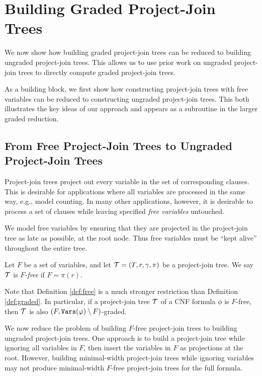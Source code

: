 








\section{Building Graded Project-Join Trees}

We now show how building graded project-join trees can be reduced to building ungraded project-join trees. 
This allows us to use prior work on ungraded project-join trees \cite{dudek2020dpmc} to directly compute graded project-join trees.

As a building block, we first show how constructing project-join trees with free variables can be reduced to constructing ungraded project-join trees. This both illustrates the key ideas of our approach and appears as a subroutine in the larger graded reduction.

\subsection{From Free Project-Join Trees to Ungraded Project-Join Trees}
\label{sec:planning:free}
Project-join trees project out every variable in the set of corresponding clauses. This is desirable for applications where all variables are processed in the same way, e.g., model counting. In many other applications, however, it is desirable to process a set of clauses while leaving specified \emph{free variables} untouched. 
 
We model free variables by ensuring that they are projected in the project-join tree as late as possible, at the root node. Thus free variables must be ``kept alive'' throughout the entire tree.
\begin{definition}
\label{def:free}
Let $F$ be a set of variables, and let $\mathcal{T} = (T, r, \gamma, \pi)$ be a project-join tree. We say $\mathcal{T}$ is \emph{$F$-free} if $F = \pi(r)$.
\end{definition}

Note that Definition \ref{def:free} is a much stronger restriction than Definition \ref{def:graded}. 
In particular, if a project-join tree $\mathcal{T}$ of a CNF formula $\phi$ is $F$-free, then $\mathcal{T}$ is also $(F, \texttt{\upshape Vars}(\varphi) \setminus F)$-graded.

We now reduce the problem of building $F$-free project-join trees to building ungraded project-join trees. One approach is to build a project-join tree while ignoring all variables in $F$, then insert the variables in $F$ as projections at the root. 
However, building minimal-width project-join trees while ignoring variables may not produce minimal-width $F$-free project-join trees for the full formula.

